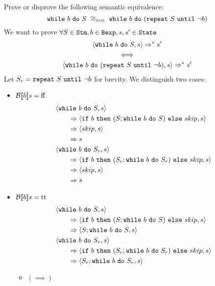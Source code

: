 \begin{exercise}{
    Prove or disprove the following semantic equivalence:
    \[ \wwhile{b}{S}\ \SOScong\ \wwhile{b}{(\wrepeat{S}{\neg b})}  \]
}
    We want to prove $\forall S \in \texttt{Stm}, b \in \texttt{Bexp}, s, s' \in \texttt{State}$
    \begin{gather*}
        \left<\texttt{while}\ b\ \texttt{do}\ S, s\right> \Rightarrow^* s' \\
        \iff \\
        \left<\texttt{while}\ b\ \texttt{do}\ (\texttt{repeat}\ S\ \texttt{until}\ \neg b), s\right> \Rightarrow^* s'
    \end{gather*}
    Let $S_r = \texttt{repeat}\ S\ \texttt{until}\ \neg b$ for brevity.
    We distinguish two cases:
    \begin{itemize}
        \item $\mathcal{B} \llbracket b \rrbracket s = \text{ff}$
            \begin{align*}
                &\left<\texttt{while}\ b\ \texttt{do}\ S, s\right>
                \\&\qquad\Rightarrow \left<\texttt{if}\ b\ \texttt{then}\ (S;\texttt{while}\ b\ \texttt{do}\ S)\ \texttt{else}\ skip, s\right>
                \\&\qquad\Rightarrow \left<skip, s\right>
                \\&\qquad\Rightarrow s
                \\
                &\left<\texttt{while}\ b\ \texttt{do}\ S_r, s\right>
                \\&\qquad\Rightarrow \left<\texttt{if}\ b\ \texttt{then}\ (S_r; \texttt{while}\ b\ \texttt{do}\ S_r)\ \texttt{else}\ skip, s\right>
                \\&\qquad\Rightarrow \left<skip, s\right>
                \\&\qquad\Rightarrow s
            \end{align*}
        \item $\mathcal{B} \llbracket b \rrbracket s = \text{tt}$
            \begin{align*}
                &\left<\texttt{while}\ b\ \texttt{do}\ S, s\right>
                \\&\qquad\Rightarrow \left<\texttt{if}\ b\ \texttt{then}\ (S;\texttt{while}\ b\ \texttt{do}\ S)\ \texttt{else}\ skip, s\right>
                \\&\qquad\Rightarrow \left<S;\texttt{while}\ b\ \texttt{do}\ S, s\right>
                \\
                &\left<\texttt{while}\ b\ \texttt{do}\ S_r, s\right>
                \\&\qquad\Rightarrow \left<\texttt{if}\ b\ \texttt{then}\ (S_r; \texttt{while}\ b\ \texttt{do}\ S_r)\ \texttt{else}\ skip, s\right>
                \\&\qquad\Rightarrow \left<S_r; \texttt{while}\ b\ \texttt{do}\ S_r, s\right>
            \end{align*}
            \begin{itemize}
                \item $(\implies)$ \vspace{0.2cm} \\

\end{itemize}
\end{itemize}
\end{exercise}
